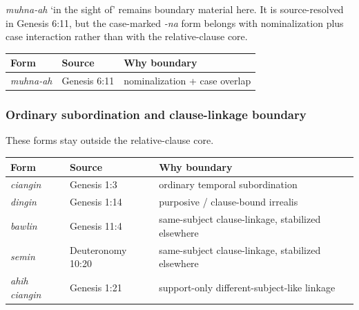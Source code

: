 \documentclass[
  11pt,
  a4paper,
]{article}
\newcounter{none} %
\newcommand{\tdim}[1]{\textit{#1}}
\newcommand{\glossquote}[1]{`#1'}
\begin{document}
\tdim{muhna-ah} \glossquote{in the sight of} remains boundary material
here. It is source-resolved in Genesis 6:11, but the case-marked
\tdim{-na} form belongs with nominalization plus case interaction rather
than with the relative-clause core.

{\def\LTcaptype{none} %
\begin{longtable}[]{@{}lll@{}}
\toprule\noalign{}
Form & Source & Why boundary \\
\midrule\noalign{}
\endhead
\bottomrule\noalign{}
\endlastfoot
\tdim{muhna-ah} & Genesis 6:11 & nominalization + case overlap \\
\end{longtable}
}

\subsubsection{Ordinary subordination and clause-linkage
boundary}\label{ordinary-subordination-and-clause-linkage-boundary}

These forms stay outside the relative-clause core.

{\def\LTcaptype{none} %
\begin{longtable}[]{@{}
  >{\raggedright\arraybackslash}p{}
  >{\raggedright\arraybackslash}p{}
  >{\raggedright\arraybackslash}p{}@{}}
\toprule\noalign{}
\begin{minipage}[b]{\linewidth}\raggedright
Form
\end{minipage} & \begin{minipage}[b]{\linewidth}\raggedright
Source
\end{minipage} & \begin{minipage}[b]{\linewidth}\raggedright
Why boundary
\end{minipage} \\
\midrule\noalign{}
\endhead
\bottomrule\noalign{}
\endlastfoot
\tdim{ciangin} & Genesis 1:3 & ordinary temporal subordination \\
\tdim{dingin} & Genesis 1:14 & purposive / clause-bound irrealis \\
\tdim{bawlin} & Genesis 11:4 & same-subject clause-linkage, stabilized
elsewhere \\
\tdim{semin} & Deuteronomy 10:20 & same-subject clause-linkage,
stabilized elsewhere \\
\tdim{ahih ciangin} & Genesis 1:21 & support-only different-subject-like
linkage \\
\end{longtable}
}
\end{document}
